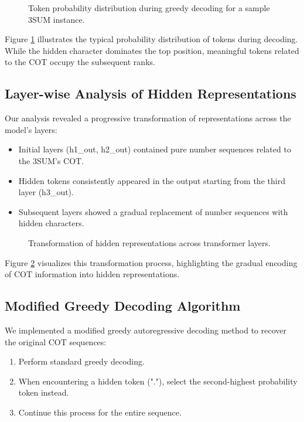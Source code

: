 \documentclass[11pt,a4paper]{article}
\begin{document}
\begin{figure}[h]
\centering
{}
\caption{Token probability distribution during greedy decoding for a sample 3SUM instance.}
\label{fig:token_probs}
\end{figure}

Figure \ref{fig:token_probs} illustrates the typical probability distribution of tokens during decoding. While the hidden character dominates the top position, meaningful tokens related to the COT occupy the subsequent ranks.

\subsection{Layer-wise Analysis of Hidden Representations}
Our analysis revealed a progressive transformation of representations across the model's layers:

\begin{itemize}
    \item Initial layers (h1\_out, h2\_out) contained pure number sequences related to the 3SUM's COT.
    \item Hidden tokens consistently appeared in the output starting from the third layer (h3\_out).
    \item Subsequent layers showed a gradual replacement of number sequences with hidden characters.
\end{itemize}

\begin{figure}[h]
\centering
{}
\caption{Transformation of hidden representations across transformer layers.}
\label{fig:layer_transform}
\end{figure}

Figure \ref{fig:layer_transform} visualizes this transformation process, highlighting the gradual encoding of COT information into hidden representations.

\subsection{Modified Greedy Decoding Algorithm}
We implemented a modified greedy autoregressive decoding method to recover the original COT sequences:

\begin{enumerate}
    \item Perform standard greedy decoding.
    \item When encountering a hidden token ("."), select the second-highest probability token instead.
    \item Continue this process for the entire sequence.
\end{enumerate}
\end{document}
